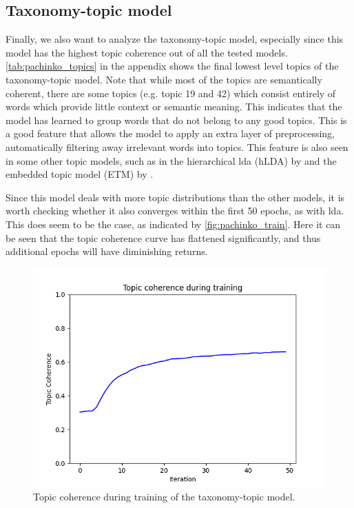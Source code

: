 \subsection{Taxonomy-topic model}\label{sec:taxonomy_analysis}
Finally, we also want to analyze the taxonomy-topic model, especially since this model has the highest topic coherence out of all the tested models.
\autoref{tab:pachinko_topics} in the appendix shows the final lowest level topics of the taxonomy-topic model.
Note that while most of the topics are semantically coherent, there are some topics (e.g. topic 19 and 42) which consist entirely of words which provide little context or semantic meaning.
This indicates that the model has learned to group words that do not belong to any good topics.
This is a good feature that allows the model to apply an extra layer of preprocessing, automatically filtering away irrelevant words into topics.
This feature is also seen in some other topic models, such as in the hierarchical \gls{lda} (hLDA) by \citet{hLDA2004} and the embedded topic model (ETM) by \citet{dieng2020topic}. 

Since this model deals with more topic distributions than the other models, it is worth checking whether it also converges within the first 50 epochs, as with \gls{lda}.
This does seem to be the case, as indicated by \autoref{fig:pachinko_train}.
Here it can be seen that the topic coherence curve has flattened significantly, and thus additional epochs will have diminishing returns.

\begin{figure}
	\centering
	\includegraphics[width= \linewidth]{figures/pachinko_training.PNG}
	\caption{Topic coherence during training of the taxonomy-topic model.}
	\label{fig:pachinko_train}
\end{figure}

